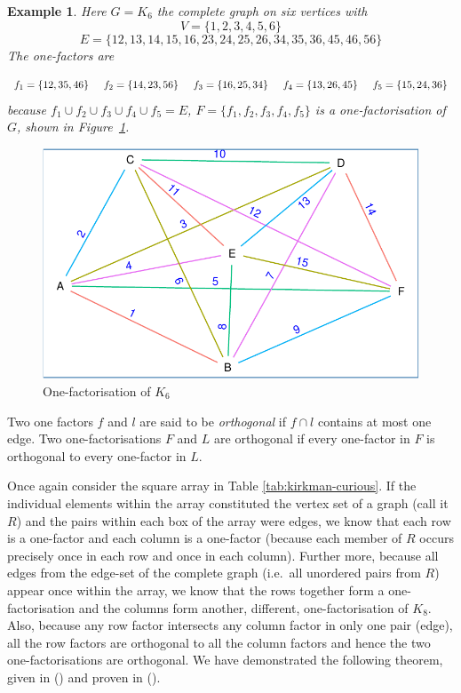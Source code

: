 \documentclass[
  11pt,
  a4paper]{book}
\newtheorem{example}{Example}
\begin{document}
\begin{example}
Here
$G = K_6$
the complete graph on six vertices with
$$V = \{1, 2, 3, 4, 5, 6\}$$
$$E = \{12, 13, 14, 15, 16, 23, 24, 25, 26, 34, 35, 36, 45, 46, 56\}$$
The one-factors are

$$
f_1 = \{12, 35, 46\} \hspace{0.5cm}
f_2 = \{14, 23, 56\} \hspace{0.5cm}
f_3 = \{16, 25, 34\} \hspace{0.5cm}
f_4 = \{13, 26, 45\} \hspace{0.5cm} 
f_5 = \{15, 24, 36\}
$$
because
$f_1 \cup f_2 \cup f_3 \cup f_4 \cup f_5 = E$,
$F = \{f_1, f_2, f_3, f_4, f_5\}$
is a one-factorisation of
$G$,
shown in Figure~\ref{fig:one-factorisation}.
\end{example}

\begin{figure}
\centering
\includegraphics{figure/one-factorisation-1.pdf}
\caption{\label{fig:one-factorisation}One-factorisation of \(K_6\)}
\end{figure}

Two one factors \(f\) and \(l\) are said to be \emph{orthogonal} if
\(f \cap l\) contains at most one edge. Two one-factorisations
\(F\) and \(L\) are orthogonal if every one-factor in \(F\) is
orthogonal to every one-factor in \(L\).

Once again consider the square array in Table \ref{tab:kirkman-curious}.
If the
individual elements within the array constituted the vertex
set of a graph (call it \(R\)) and the pairs within each box
of the array were edges, we know that each row is a
one-factor and each column is a one-factor (because each
member of \(R\) occurs precisely once in each row and once
in each column). Further more, because all edges from the
edge-set of the complete graph (i.e.~all unordered pairs
from \(R\)) appear once within the array, we know that the
rows together form a one-factorisation and the columns form
another, different, one-factorisation of \(K_8\). Also,
because any row factor intersects any column factor in only
one pair (edge), all the row factors are orthogonal to all
the column factors and hence the two one-factorisations are
orthogonal. We have demonstrated the following theorem,
given in
(\textcite{dinitz_contemporary_1992})
and proven in
(\textcite{nemeth_study_1969}).
\end{document}

